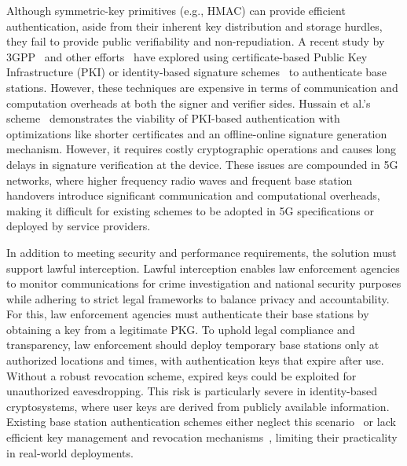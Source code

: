 Although symmetric-key primitives (e.g., HMAC) can provide efficient authentication, aside from their inherent key distribution and storage hurdles, they fail to provide public verifiability and non-repudiation. 
A recent study by 3GPP~\cite{3GPP:33.809} and other efforts~\cite{lee2009extended, yi1998optimized, zheng1996authentication, gao2021evaluating} have explored using certificate-based Public Key Infrastructure (PKI) or identity-based signature schemes~\cite{boneh2001short, cheng2017sm9, IEEE1363} to authenticate
base stations. However, these techniques are expensive in terms of communication and computation overheads at both the signer and verifier sides. 
Hussain et al.'s scheme~\cite{hussain2019insecure} demonstrates the viability of PKI-based authentication with optimizations like shorter certificates and an offline-online signature generation mechanism. However, it requires costly cryptographic operations and causes long delays in signature verification at the device. These issues are compounded in 5G networks, where higher frequency radio waves and frequent base station handovers introduce significant communication and computational overheads, making it difficult for existing schemes to be adopted in 5G specifications or deployed by service providers. 

In addition to meeting security and performance requirements, the solution must support lawful interception. Lawful interception enables law enforcement agencies to monitor communications for crime investigation and national security purposes while adhering to strict legal frameworks to balance privacy and accountability. For this, law enforcement agencies must authenticate their base stations by obtaining a key from a legitimate PKG. To uphold legal compliance and transparency, law enforcement should deploy temporary base stations only at authorized locations and times, with authentication keys that expire after use. Without a robust revocation scheme, expired keys could be exploited for unauthorized eavesdropping. This risk is particularly severe in identity-based cryptosystems, where user keys are derived from publicly available information.
Existing base station authentication schemes either neglect this scenario~\cite{hussain2019insecure} or lack efficient key management and revocation mechanisms~\cite{singla2021look}, limiting their practicality in real-world deployments.

